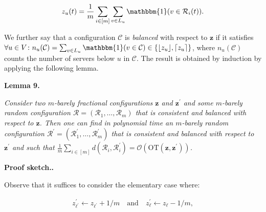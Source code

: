 \[\begin{gathered}
z_{u}(t)=\frac{1}{m}\sum_{i\in[m]}\sum_{v\in L_{u}}\mathbbm{1}(v\in\mathcal{R}_{i}(t)).
\end{gathered}\]


We further say that a configuration $\mathcal{C}$ is \emph{balanced} with respect to ${\mathbf{z}}$ if it satisfies
$\forall u\in V\colon n_{u}(\mathcal{C})=\sum_{v\in L_{u}}\mathbbm{1}(v\in\mathcal{C})\in\{{\lfloor z_{u}\rfloor},{\lceil z_{u}\rceil}\}$,
where $n_{u}(\mathcal{C})$ counts the number of servers below $u$ in $\mathcal{C}$.
The result is obtained by induction by applying the following lemma.\par





\par\medskip\noindent\textbf{
\textbf{Lemma 9}\textbf{.}
}\par



\emph{Consider two $m$-barely fractional configurations ${\mathbf{z}}$ and ${\mathbf{z}}^{\prime}$ and some $m$-barely random configuration $\mathcal{R}=(\mathcal{R}_{1},\dots,\mathcal{R}_{m})$ that is consistent and balanced with respect to ${\mathbf{z}}$. Then one can find in polynomial time an $m$-barely random configuration $\mathcal{R}^{\prime}=(\mathcal{R}_{1}^{\prime},\dots,\mathcal{R}_{m}^{\prime})$ that is consistent and balanced with respect to ${\mathbf{z}}^{\prime}$ and such that $\frac{1}{m}\sum_{i\in[m]}d(\mathcal{R}_{i},\mathcal{R}_{i}^{\prime})=\mathcal{O}({\text{OT}}({\mathbf{z}},{\mathbf{z}}^{\prime}))$.}\par







\par\medskip\noindent\textbf{Proof sketch..}\par




Observe that it suffices to consider the elementary case where:\par


\[\begin{gathered}
z_{\ell^{\prime}}^{\prime}\leftarrow z_{\ell^{\prime}}+1/m\quad\text{and}\quad
z_{\ell}^{\prime}\leftarrow z_{\ell}-1/m,
\end{gathered}\]


